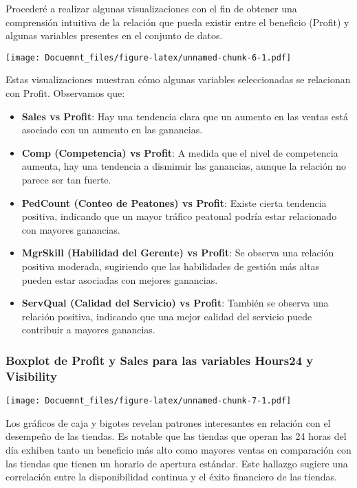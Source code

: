 \documentclass[
]{article}
\begin{document}
Procederé a realizar algunas visualizaciones con el fin de obtener una
comprensión intuitiva de la relación que pueda existir entre el
beneficio (Profit) y algunas variables presentes en el conjunto de
datos.

\texttt{[image: Docuemnt\_files/figure-latex/unnamed-chunk-6-1.pdf]}

Estas visualizaciones muestran cómo algunas variables seleccionadas se
relacionan con Profit. Observamos que:

\begin{itemize}
\item
  \textbf{Sales vs Profit}: Hay una tendencia clara que un aumento en
  las ventas está asociado con un aumento en las ganancias.
\item
  \textbf{Comp (Competencia) vs Profit}: A medida que el nivel de
  competencia aumenta, hay una tendencia a disminuir las ganancias,
  aunque la relación no parece ser tan fuerte.
\item
  \textbf{PedCount (Conteo de Peatones) vs Profit}: Existe cierta
  tendencia positiva, indicando que un mayor tráfico peatonal podría
  estar relacionado con mayores ganancias.
\item
  \textbf{MgrSkill (Habilidad del Gerente) vs Profit}: Se observa una
  relación positiva moderada, sugiriendo que las habilidades de gestión
  más altas pueden estar asociadas con mejores ganancias.
\item
  \textbf{ServQual (Calidad del Servicio) vs Profit}: También se observa
  una relación positiva, indicando que una mejor calidad del servicio
  puede contribuir a mayores ganancias.
\end{itemize}

\hypertarget{boxplot-de-profit-y-sales-para-las-variables-hours24-y-visibility}{%
\subsubsection{Boxplot de Profit y Sales para las variables Hours24 y
Visibility}\label{boxplot-de-profit-y-sales-para-las-variables-hours24-y-visibility}}

\texttt{[image: Docuemnt\_files/figure-latex/unnamed-chunk-7-1.pdf]}

Los gráficos de caja y bigotes revelan patrones interesantes en relación
con el desempeño de las tiendas. Es notable que las tiendas que operan
las 24 horas del día exhiben tanto un beneficio más alto como mayores
ventas en comparación con las tiendas que tienen un horario de apertura
estándar. Este hallazgo sugiere una correlación entre la disponibilidad
continua y el éxito financiero de las tiendas.
\end{document}

